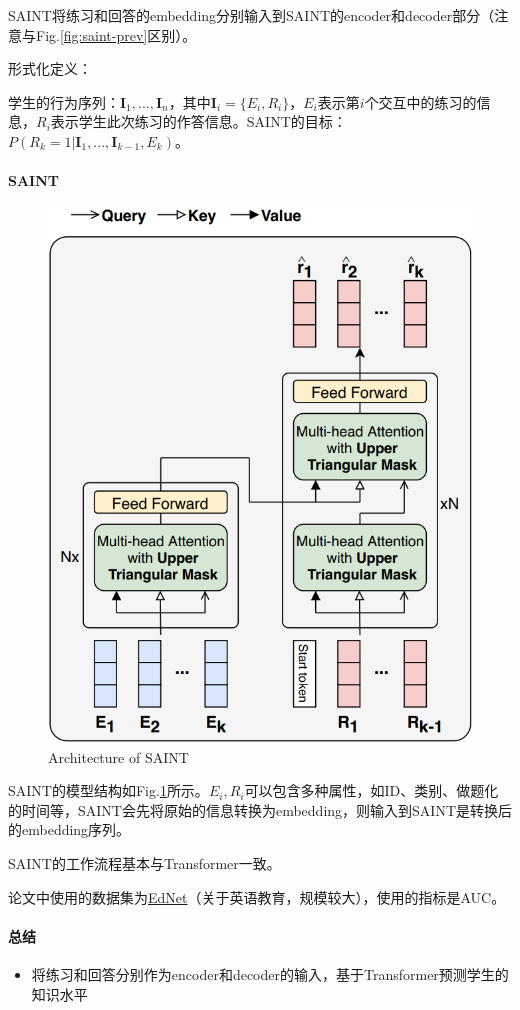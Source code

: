 SAINT将练习和回答的embedding分别输入到SAINT的encoder和decoder部分（注意与Fig.\ref{fig:saint-prev}区别）。

形式化定义：

学生的行为序列：$\boldsymbol{I}_1, ..., \boldsymbol{I}_n$，其中$\boldsymbol{I}_i = \{E_i, R_i\}$，$E_i$表示第$i$个交互中的练习的信息，$R_i$表示学生此次练习的作答信息。SAINT的目标：$P(R_k = 1 | \boldsymbol{I}_1, ..., \boldsymbol{I}_{k-1}, E_k)$。

\paragraph{SAINT}
\begin{figure}[h]
	\centering
	\includegraphics[width=.38\textwidth]{pics/saint.png}
	\caption{Architecture of SAINT}
	\label{fig:saint}
\end{figure}
SAINT的模型结构如Fig.\ref{fig:saint}所示。$E_i, R_i$可以包含多种属性，如ID、类别、做题化的时间等，SAINT会先将原始的信息转换为embedding，则输入到SAINT是转换后的embedding序列。

SAINT的工作流程基本与Transformer一致。

论文中使用的数据集为\href{https://github.com/riiid/ednet}{EdNet}（关于英语教育，规模较大），使用的指标是AUC。

\paragraph{总结}

\begin{itemize}
	\item 将练习和回答分别作为encoder和decoder的输入，基于Transformer预测学生的知识水平
	
\end{itemize}

